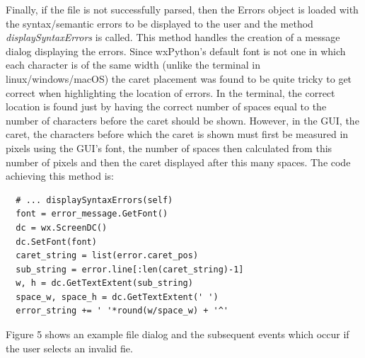 \documentclass{article}					%
\begin{document}
Finally, if the file is not successfully parsed, then the Errors object is loaded with the syntax/semantic errors to be displayed to the user and the method \textit{displaySyntaxErrors} is called. This method handles the creation of a message dialog displaying the errors. Since wxPython's default font is not one in which each character is of the same width (unlike the terminal in linux/windows/macOS) the caret placement was found to be quite tricky to get correct when highlighting the location of errors. In the terminal, the correct location is found just by having the correct number of spaces equal to the number of characters before the caret should be shown. However, in the GUI, the caret, the characters before which the caret is shown must first be measured in pixels using the GUI's font, the number of spaces then calculated from this number of pixels and then the caret displayed after this many spaces. The code achieving this method is:
\begin{verbatim}
  # ... displaySyntaxErrors(self)
  font = error_message.GetFont()
  dc = wx.ScreenDC()
  dc.SetFont(font)
  caret_string = list(error.caret_pos)
  sub_string = error.line[:len(caret_string)-1]
  w, h = dc.GetTextExtent(sub_string)
  space_w, space_h = dc.GetTextExtent(' ')
  error_string += ' '*round(w/space_w) + '^'
\end{verbatim}
Figure 5 shows an example file dialog and the subsequent events which occur if the user selects an invalid fie.
\end{document}
